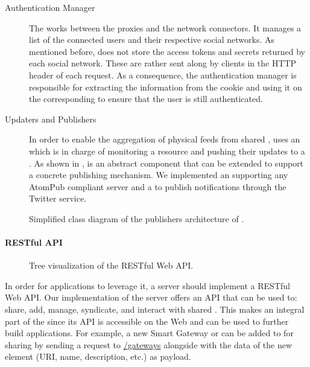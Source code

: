 \begin{description}
  \item[Authentication Manager] The  works between the proxies and the network connectors. It manages a list of the connected users and their respective social networks. As mentioned before, \sac{} does not store the access tokens and secrets returned by each social network. These are rather sent along by clients in the HTTP header of each request. As a consequence, the authentication manager is responsible for extracting the information from the cookie and using it on the corresponding  to ensure that the user is still authenticated.

  \item[Updaters and Publishers] In order to enable the aggregation of physical feeds from shared \sts{}, \sac{} uses an  which is in charge of monitoring a resource and pushing their updates to a . As shown in ,  is an abstract component that can be extended to support a concrete publishing mechanism. We implemented an  supporting any AtomPub compliant server and a  to publish notifications through the Twitter service. 
\end{description}
\begin{figure}
\caption{Simplified class diagram of the publishers architecture of \sac{}.}
\label{fig:sac-publisher-archi}
\end{figure}

\paragraph{RESTful API}
\begin{figure}
\caption{Tree visualization of the \sac{} RESTful Web API.}
\label{fig:sac-api}
\end{figure}
In order for applications to leverage it, a \sac{} server should implement a RESTful Web API. Our implementation of the \sac{} server offers an API that can be used to: share, add, manage, syndicate, and interact with shared \sts{}. This makes \sac{} an integral part of the \WoT{} since its API is accessible on the Web and can be used to further build applications. For example, a new Smart Gateway or \st{} can be added to \sac{} for sharing by sending a  request to \url{/gateways} alongside with the data of the new element (URI, name, description, etc.) as payload.


